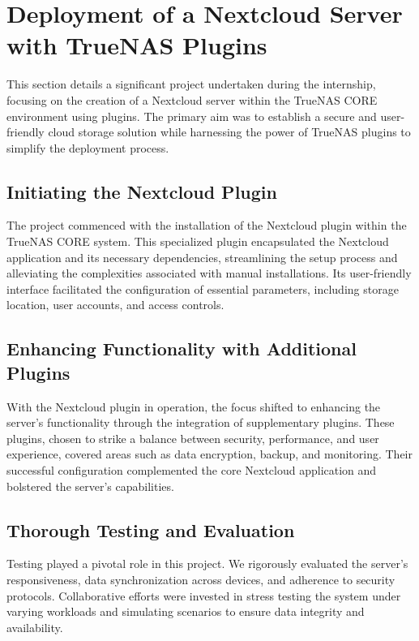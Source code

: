 \section{Deployment of a Nextcloud Server with TrueNAS Plugins}

This section details a significant project undertaken during the internship, focusing on the creation of a Nextcloud server within the TrueNAS CORE environment using plugins. The primary aim was to establish a secure and user-friendly cloud storage solution while harnessing the power of TrueNAS plugins to simplify the deployment process.

\subsection{Initiating the Nextcloud Plugin}

The project commenced with the installation of the Nextcloud plugin within the TrueNAS CORE system. This specialized plugin encapsulated the Nextcloud application and its necessary dependencies, streamlining the setup process and alleviating the complexities associated with manual installations. Its user-friendly interface facilitated the configuration of essential parameters, including storage location, user accounts, and access controls.

\subsection{Enhancing Functionality with Additional Plugins}

With the Nextcloud plugin in operation, the focus shifted to enhancing the server's functionality through the integration of supplementary plugins. These plugins, chosen to strike a balance between security, performance, and user experience, covered areas such as data encryption, backup, and monitoring. Their successful configuration complemented the core Nextcloud application and bolstered the server's capabilities.

\subsection{Thorough Testing and Evaluation}

Testing played a pivotal role in this project. We rigorously evaluated the server's responsiveness, data synchronization across devices, and adherence to security protocols. Collaborative efforts were invested in stress testing the system under varying workloads and simulating scenarios to ensure data integrity and availability.

